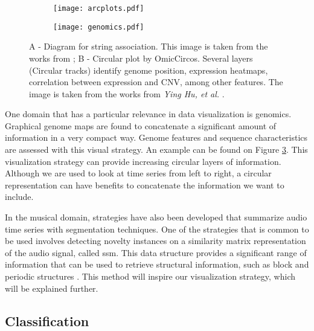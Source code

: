 \begin{figure}[b]
    \centering
    \begin{subfigure}{0.5\linewidth}
    \centering
        \texttt{[image: arcplots.pdf]}
        \caption{}
        \label{fig:genomic1}
    \end{subfigure}%
    \begin{subfigure}{0.5\linewidth}
        \centering
        \texttt{[image: genomics.pdf]}
        \caption{}
        \label{fig:genomic2}
    \end{subfigure}
    \caption{A - Diagram for string association. This image is taken from the works from \cite{arcplots}; B - Circular plot by OmicCircos. Several layers (Circular tracks) identify genome position, expression heatmaps, correlation between expression and CNV, among other features. The image is taken from the works from \textit{Ying Hu, et al.} \cite{genomics}.}
\end{figure}

One domain that has a particular relevance in data visualization is genomics. Graphical genome maps are found to concatenate a significant amount of information in a very compact way. Genome features and sequence characteristics are assessed with this visual strategy. An example can be found on Figure \ref{fig:genomic2}. This visualization strategy can provide increasing circular layers of information. Although we are used to look at time series from left to right, a circular representation can have benefits to concatenate the information we want to include.
\par
In the musical domain, strategies have also been developed that summarize audio time series with segmentation techniques. One of the strategies that is common to be used involves detecting novelty instances on a similarity matrix representation of the audio signal, called \gls{ssm}. This data structure provides a significant range of information that can be used to retrieve structural information, such as block and periodic structures \cite{fmp1, fmp2, audiolabs1, audiolabs2}. This method will inspire our visualization strategy, which will be explained further.


\subsection{Classification}

